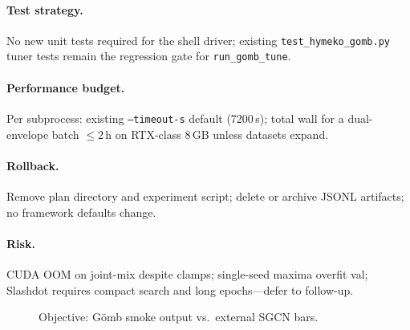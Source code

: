 \documentclass{article}
\begin{document}
\paragraph{Test strategy.}
No new unit tests required for the shell driver; existing
\texttt{test\_hymeko\_gomb.py} tuner tests remain the regression gate for
\texttt{run\_gomb\_tune}.

\paragraph{Performance budget.}
Per subprocess: existing \texttt{--timeout-s} default (7200\,s); total wall
for a dual-envelope batch $\leq$2\,h on RTX-class 8\,GB unless datasets
expand.

\paragraph{Rollback.}
Remove plan directory and experiment script; delete or archive JSONL
artifacts; no framework defaults change.

\paragraph{Risk.}
CUDA OOM on joint-mix despite clamps; single-seed maxima overfit val;
Slashdot requires compact search and long epochs---defer to follow-up.

\begin{figure}[h]
\centering

\caption{Objective: G\"omb smoke output vs.\ external SGCN bars.}
\end{figure}
\end{document}
